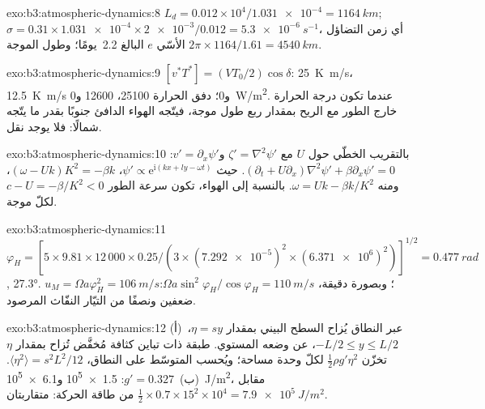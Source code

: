 \begin{solution}{exo:b3:atmospheric-dynamics:8}
$L_d = 0.012\times10^4/\num{1.031e-4} = \qty{1164}{km}$; $\sigma =
0.31\times\num{1.031e-4}\times\num{2e-3}/0.012 = \qty{5.3e-6}{s^{-1}}$، أي
زمن التضاؤل الأسّي $e$ البالغ \num{2.2}~يومًا؛ وطول الموجة $2\pi\times1164/1.61 =
\qty{4540}{km}$.
\end{solution}

\begin{solution}{exo:b3:atmospheric-dynamics:9}
$[v^*T^*] = (VT_0/2)\cos\delta$: \qty{25}{K.m/s}، \qty{12.5}{K.m/s} و0؛
دفق الحرارة \num{25100}، \num{12600} و\qty{0}{W/m^2}. عندما تكون
درجة الحرارة خارج الطور مع الريح بمقدار ربع طول موجة، فيتّجه الهواء الدافئ
جنوبًا بقدر ما يتّجه شمالًا: فلا يوجد نقل.
\end{solution}

\begin{solution}{exo:b3:atmospheric-dynamics:10}
بالتقريب الخطّي حول $U$ مع $\zeta' = \nabla^2\psi'$ و$v' =
\partial_x\psi'$: $(\partial_t + U\partial_x)\nabla^2\psi' + \beta\partial_x
\psi' = 0$. حيث $\psi' \propto \mathrm e^{\mathrm i(kx + ly - \omega t)}$،
$(\omega - Uk)K^2 = -\beta k$، ومنه $\omega = Uk - \beta k/K^2$. بالنسبة إلى
الهواء، تكون سرعة الطور $c - U = -\beta/K^2 < 0$ لكلّ موجة.
\end{solution}

\begin{solution}{exo:b3:atmospheric-dynamics:11}
$\varphi_H = [5\times9.81\times12\,000\times0.25/(3\times(\num{7.292e-5})^2
\times(\num{6.371e6})^2)]^{1/2} = \qty{0.477}{rad}$, \ang{27.3}.
$u_M = \Omega a\varphi_H^2 = \qty{106}{m/s}$؛ وبصورة دقيقة، $\Omega a\sin^2
\varphi_H/\cos\varphi_H = \qty{110}{m/s}$: ضعفين ونصفًا
من التيّار النفّاث المرصود.
\end{solution}

\begin{solution}{exo:b3:atmospheric-dynamics:12}
(أ)~عبر النطاق يُزاح السطح البيني بمقدار $\eta = sy$، $-L/2 \le y
\le L/2$، عن وضعه المستوي. طبقة ذات تباين كثافة مُخفَّض
تُزاح بمقدار $\eta$ تخزّن $\tfrac12\rho g'\eta^2$ لكلّ وحدة مساحة؛ ويُحسب المتوسّط
على النطاق، $\langle\eta^2\rangle = s^2L^2/12$. (ب)~$g' = 0.327$:
\num{1.5e5} و\qty{6.1e5}{J/m^2}، مقابل $\tfrac12\times0.7\times15^2
\times10^4 = \qty{7.9e5}{J/m^2}$ من طاقة الحركة: متقاربتان.
\end{solution}

